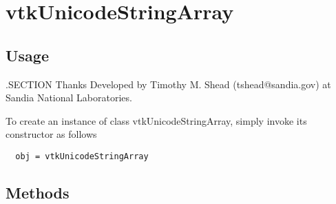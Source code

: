\section{vtkUnicodeStringArray}

\subsection{Usage}


 .SECTION Thanks
 Developed by Timothy M. Shead (tshead@sandia.gov) at Sandia National Laboratories.

To create an instance of class vtkUnicodeStringArray, simply
invoke its constructor as follows
\begin{verbatim}
  obj = vtkUnicodeStringArray
\end{verbatim}
\subsection{Methods}

